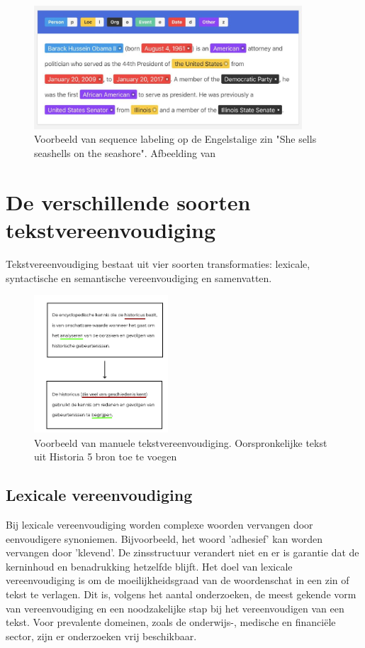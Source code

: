 \begin{figure}
	\begin{center}
		\includegraphics[width=10cm]{img/nerlabeling.jpg}
	\end{center}
	\caption{Voorbeeld van sequence labeling op de Engelstalige zin "She sells seashells on the seashore". Afbeelding van \textcite{Bilisci2021} }
	\label{fig:ner}
\end{figure}

\section{De verschillende soorten tekstvereenvoudiging}

Tekstvereenvoudiging bestaat uit vier soorten transformaties: lexicale, syntactische en semantische vereenvoudiging en samenvatten.

\begin{figure}
	\begin{center}
			\includegraphics[width=5cm]{img/voorbeeld-manuele-vereenvoudiging.png}
	\end{center}
	\caption{Voorbeeld van manuele tekstvereenvoudiging. Oorspronkelijke tekst uit Historia 5 bron toe te voegen}
\end{figure}

\subsection{Lexicale vereenvoudiging}

Bij lexicale vereenvoudiging worden complexe woorden vervangen door eenvoudigere synoniemen. Bijvoorbeeld, het woord 'adhesief' kan worden vervangen door 'klevend'. De zinsstructuur verandert niet en er is garantie dat de kerninhoud en benadrukking hetzelfde blijft. Het doel van lexicale vereenvoudiging is om de moeilijkheidsgraad van de woordenschat in een zin of tekst te verlagen. Dit is, volgens het aantal onderzoeken, de meest gekende vorm van vereenvoudiging en een noodzakelijke stap bij het vereenvoudigen van een tekst. Voor prevalente domeinen, zoals de onderwijs-, medische en financiële sector, zijn er onderzoeken vrij beschikbaar. 

